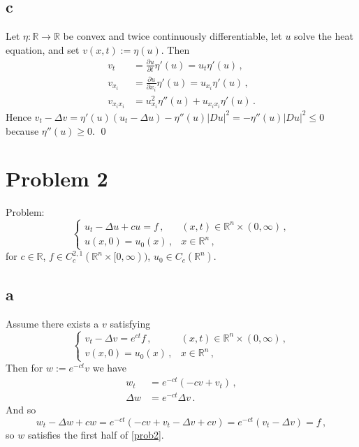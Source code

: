 \documentclass[11pt]{amsart}
\theoremstyle{definition}
\newcommand{\R}{\mathbb{R}}
\numberwithin{equation}{section}
\begin{document}
\subsection*{c}Let $\eta: \R \to \R$ be convex and twice continuously differentiable, let $u$ solve the heat equation, and set $v(x,t) := \eta(u)$. Then
\begin{align}
v_t &= \frac{\partial u}{\partial t}\eta'(u) = u_t \eta'(u)\,,\\
v_{x_i} &= \frac{\partial u}{\partial x_i}\eta'(u) = u_{x_i} \eta'(u)\,,\\
v_{x_i x_i} &=
u_{x_i}^2 \eta''(u) + u_{x_i x_i} \eta'(u)\,.
\end{align}
Hence $v_t - \Delta v = \eta'(u)(u_t - \Delta u) - \eta''(u)|Du|^2 = -\eta''(u)|Du|^2 \leq 0$ because $\eta''(u) \geq 0$. \qed

\section{Problem 2}
Problem:
\begin{equation} \tag{*}\label{prob2}
\left\{
\begin{array}{cc}
u_t - \Delta u + cu = f\,, & (x,t) \in \R^n\times(0,\infty) \,, \\
u(x,0) = u_0(x)\,, & x\in\R^n\,,
\end{array}
\right.
\end{equation}
for $c \in \R$, $f \in C_c^{2,1}(\R^n \times [0,\infty))$, $u_0 \in C_c(\R^n)$.

\subsection*{a}
Assume there exists a $v$ satisfying
\begin{equation}\tag{**}\label{prob2mod}
\left\{
\begin{array}{cc}
v_t - \Delta v = e^{ct}f\,, & (x,t) \in \R^n\times(0,\infty) \,, \\
v(x,0) = u_0(x)\,, & x\in\R^n\,,
\end{array}
\right.
\end{equation}
Then for $w := e^{-ct}v$ we have
\begin{align} \label{c2}
w_t &= e^{-ct}(-cv + v_t)\,, \\
\label{c21}
\Delta w &= e^{-ct}\Delta v\,.
\end{align}
And so
\begin{equation}
w_t - \Delta w + cw
=
e^{-ct}(-cv + v_t - \Delta v + c v)
=e^{-ct}(v_t - \Delta v) = f\,,
\end{equation}
so $w$ satisfies the first half of \eqref{prob2}.
\end{document}
